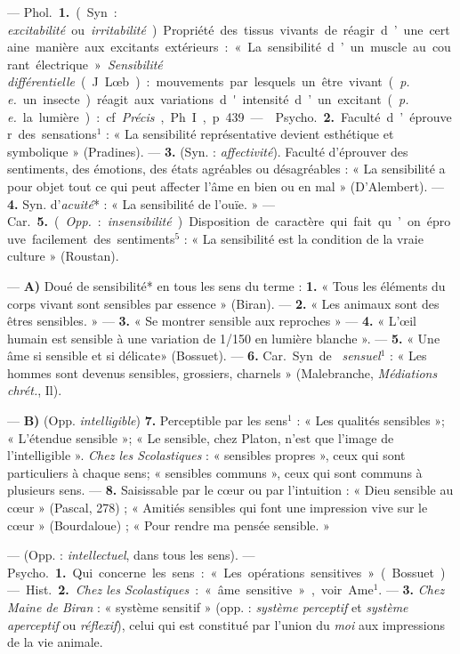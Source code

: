 \begin{itemize}[leftmargin=1cm, label=, itemsep=1pt]
 —  \si{Phol.} {\bf 1.} (Syn. : {\it
excitabilité} ou {\it irritabilité}). Propriété des tissus vivants de réagir
d’une certaine manière aux excitants extérieurs : « La sensibilité d’un
muscle au courant électrique ». {\it Sensibilité différentielle} (J. Lœb) :
mouvements par lesquels un être vivant ({\it p. e.} un insecte) réagit aux
variations d'intensité d’un excitant ({\it p. e.} la lumière) : cf.
{\it Précis}, Ph. I, p. 439.

—  \si{Psycho.} {\bf 2.} Faculté d’éprouver des
sensations$^1$ : « La sensibilité représentative devient esthétique et
symbolique » (Pradines). — {\bf 3.} (Syn. : {\it affectivité}). Faculté
d’éprouver des sentiments, des émotions, des états agréables ou
désagréables : « La sensibilité a pour objet tout ce qui peut affecter l’âme
en bien ou en mal » (D'Alembert). — {\bf 4.} Syn. d'{\it acuité}* : « La
sensibilité de l’ouïe. » — \si{Car.} {\bf 5.} ({\it Opp.} :
{\it insensibilité}). Disposition de caractère qui fait qu’on éprouve
facilement des sentiments$^5$ : « La sensibilité est la condition de la vraie
culture » (Roustan).

 — {\bf A)}  Doué de sensibilité* en tous les sens du
terme : {\bf 1.} « Tous les éléments du corps vivant sont sensibles par
essence » (Biran). —  {\bf 2.} « Les animaux sont des êtres sensibles. » —
{\bf 3.} « Se montrer sensible aux reproches » — {\bf 4.} « L’œil humain est
sensible à une variation de 1/150 en lumière blanche ». —  {\bf 5.} « Une âme
si sensible et si délicate» (Bossuet). — {\bf 6.} \si{Car.} Syn. de {\it
sensuel}$^1$ : « Les hommes sont devenus
sensibles, grossiers, charnels » (Malebranche, {\it Médiations chrét.}, Il).

— {\bf B)}  (Opp. {\it intelligible})  {\bf 7.} Perceptible
par les sens$^1$ : « Les qualités sensibles »; « L’étendue sensible »; « Le
sensible, chez Platon, n’est que l’image de l'intelligible ». {\it Chez les
Scolastiques} : « sensibles propres », ceux qui sont particuliers à chaque
sens; « sensibles communs », ceux qui sont communs à plusieurs sens. —
{\bf 8.} Saisissable par le cœur ou par l'intuition : « Dieu sensible au cœur
» (Pascal, 278) ; « Amitiés sensibles qui font une impression vive sur le
cœur » (Bourdaloue) ; « Pour rendre ma pensée sensible. »

 — (Opp. : {\it intellectuel}, dans tous les sens). —
\si{Psycho.} {\bf 1.} Qui concerne les sens : « Les opérations sensitives
» (Bossuet). — \si{Hist.} {\bf 2.} {\it Chez les Scolastiques} : « âme
sensitive », voir Ame$^1$. — {\bf 3.} {\it Chez Maine de Biran} : « système
sensitif » (opp. : {\it système perceptif} et {\it système aperceptif} ou
{\it réflexif}), celui qui est constitué par l’union du {\it moi} aux
impressions de la vie animale.


\end{itemize}
